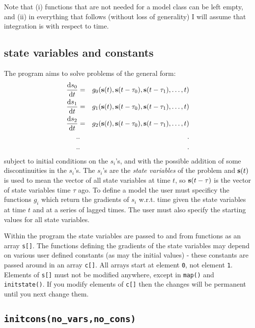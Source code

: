 \documentclass[10pt] {article}
\newcommand{\dif}[2]{\frac{{\rm d} #1}{{\rm d} #2}}
\begin{document}
Note that (i) functions that are not needed for a model class can be left empty, and (ii)
in everything that follows (without loss of generality) I will assume that integration is with %
respect to time.

\subsection{state variables and constants}

The program aims to solve problems of the general form:
\begin{eqnarray*} 
\dif{s_0}{t} & = & g_0 ({\bf s}(t),{\bf s}(t-\tau_0), {\bf s}(t-\tau_1), \ldots,t)\\
\dif{s_1}{t} & = & g_1 ({\bf s}(t),{\bf s}(t-\tau_0), {\bf s}(t-\tau_1), \ldots,t)\\
\dif{s_2}{t} & = & g_2 ({\bf s}(t),{\bf s}(t-\tau_0), {\bf s}(t-\tau_1), \ldots,t)\\
. & . & ~~~~~~~~~. \\
. & . & ~~~~~~~~~. 
\end{eqnarray*}
subject to initial conditions on the $ s_i$'s, and with the possible addition of some %
discontinuities in the $ s_i$'s. The $ s_i$'s are the {\it state variables } of the problem and $ %
{\bf s}(t)$ is used to mean the vector of all state variables at time $ t$, so $ {\bf s}(t-\tau)$ %
is the vector of state variables time $ \tau $ ago. To define a model the user must specificy the %
functions $ g_i$ which return the gradients of $ s_i$ w.r.t. time given the state variables at %
time $ t$ and at a series of lagged times. The user must also specify the starting values for all %
state variables.

Within the program the state variables are passed to and from functions as an array \verb+s[]+. %
The functions defining the gradients of the state variables may depend on various user defined %
constants (as may the initial values) - these constants are passed around in an array \verb+c[]+. %
All arrays start at element \verb+0+, not element \verb+1+. Elements of \verb+s[]+ must not be %
modified anywhere, except in \verb+map()+ and \verb+initstate()+. If you modify elements of %
\verb+c[]+ then the changes will be permanent until you next change them.

\subsection{\tt initcons(no\_vars,no\_cons)}
\end{document}
